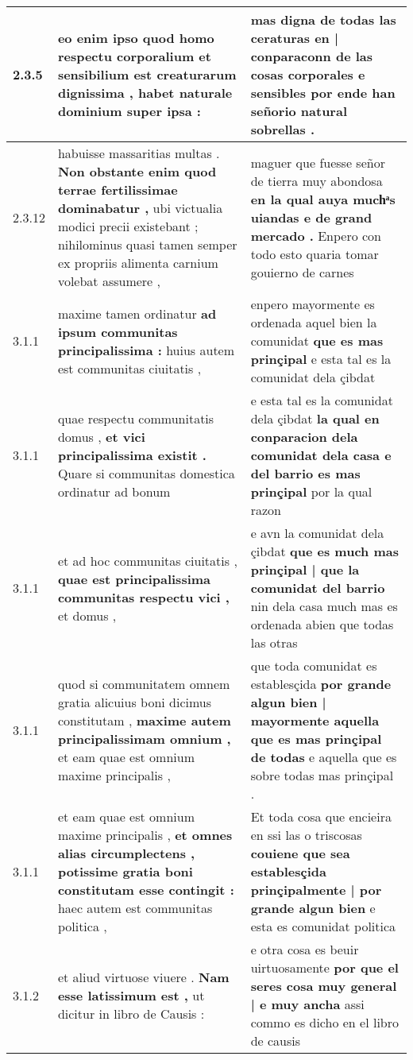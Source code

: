 \begin{tabular}{|p{1cm}|p{6.5cm}|p{6.5cm}|}
2.3.5 & eo enim ipso quod homo respectu corporalium \textbf{ et sensibilium est creaturarum dignissima , } habet naturale dominium super ipsa : & mas digna de todas las ceraturas \textbf{ en | conparaconn de las cosas corporales e sensibles } por ende han señorio natural sobrellas . \\\hline
2.3.12 & habuisse massaritias multas . \textbf{ Non obstante enim quod terrae fertilissimae dominabatur , } ubi victualia modici precii existebant ; nihilominus quasi tamen semper ex propriis alimenta carnium volebat assumere , & maguer que fuesse señor de tierra muy abondosa \textbf{ en la qual auya muchͣs uiandas e de grand mercado . } Enpero con todo esto quaria tomar gouierno de carnes \\\hline
3.1.1 & maxime tamen ordinatur \textbf{ ad ipsum communitas principalissima : } huius autem est communitas ciuitatis , & enpero mayormente es ordenada aquel bien la comunidat \textbf{ que es mas prinçipal } e esta tal es la comunidat dela çibdat \\\hline
3.1.1 & quae respectu communitatis domus , \textbf{ et vici principalissima existit . } Quare si communitas domestica ordinatur ad bonum & e esta tal es la comunidat dela çibdat \textbf{ la qual en conparacion dela comunidat dela casa e del barrio es mas prinçipal } por la qual razon \\\hline
3.1.1 & et ad hoc communitas ciuitatis , \textbf{ quae est principalissima communitas respectu vici , } et domus , & e avn la comunidat dela çibdat \textbf{ que es much mas prinçipal | que la comunidat del barrio } nin dela casa much mas es ordenada abien que todas las otras \\\hline
3.1.1 & quod si communitatem omnem gratia alicuius boni dicimus constitutam , \textbf{ maxime autem principalissimam omnium , } et eam quae est omnium maxime principalis , & que toda comunidat es establesçida \textbf{ por grande algun bien | mayormente aquella que es mas prinçipal de todas } e aquella que es sobre todas mas prinçipal . \\\hline
3.1.1 & et eam quae est omnium maxime principalis , \textbf{ et omnes alias circumplectens , potissime gratia boni constitutam esse contingit : } haec autem est communitas politica , & Et toda cosa que encieira en ssi las o triscosas \textbf{ couiene que sea establesçida prinçipalmente | por grande algun bien } e esta es comunidat politica \\\hline
3.1.2 & et aliud virtuose viuere . \textbf{ Nam esse latissimum est , } ut dicitur in libro de Causis : & e otra cosa es beuir uirtuosamente \textbf{ por que el seres cosa muy general | e muy ancha } assi commo es dicho en el libro de causis \\\hline

\end{tabular}

